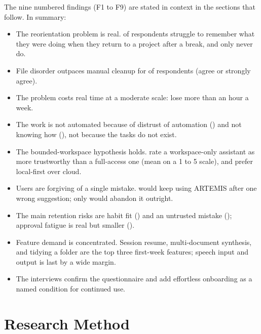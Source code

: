 \documentclass[11pt]{article}
\begin{document}
The nine numbered findings (F1 to F9) are stated in context in the sections that follow. In
summary:
\begin{itemize}[leftmargin=3.2em,labelsep=0.6em]
  \item[\textbf{F1.}] The reorientation problem is real. \PctReturnOften{}\pctsym{} of
        respondents struggle to remember what they were doing when they return to a project
        after a break, and only \PctReturnNever{}\pctsym{} never do.
  \item[\textbf{F2.}] File disorder outpaces manual cleanup for \PctMessyAgree{}\pctsym{} of
        respondents (agree or strongly agree).
  \item[\textbf{F3.}] The problem costs real time at a moderate scale:
        \PctTimeOverHour{}\pctsym{} lose more than an hour a week.
  \item[\textbf{F4.}] The work is not automated because of distrust of automation
        (\PctNoTrustAuto{}\pctsym{}) and not knowing how (\PctDontKnowHow{}\pctsym{}), not
        because the tasks do not exist.
  \item[\textbf{F5.}] The bounded-workspace hypothesis holds. \PctWorkspaceTrust{}\pctsym{}
        rate a workspace-only assistant as more trustworthy than a full-access one
        (mean \MeanWorkspaceTrust{} on a 1 to 5 scale), and \PctLocalFirst{}\pctsym{} prefer
        local-first over cloud.
  \item[\textbf{F6.}] Users are forgiving of a single mistake. \PctKeepAfterMistake{}\pctsym{}
        would keep using ARTEMIS after one wrong suggestion; only \PctQuitAfterMistake{}\pctsym{}
        would abandon it outright.
  \item[\textbf{F7.}] The main retention risks are habit fit (\PctChurnHabit{}\pctsym{}) and an
        untrusted mistake (\PctChurnMistake{}\pctsym{}); approval fatigue is real but smaller
        (\PctChurnApproval{}\pctsym{}).
  \item[\textbf{F8.}] Feature demand is concentrated. Session resume, multi-document synthesis,
        and tidying a folder are the top three first-week features; speech input and output is
        last by a wide margin.
  \item[\textbf{F9.}] The interviews confirm the questionnaire and add effortless onboarding as
        a named condition for continued use.
\end{itemize}

\section{Research Method}
\end{document}
